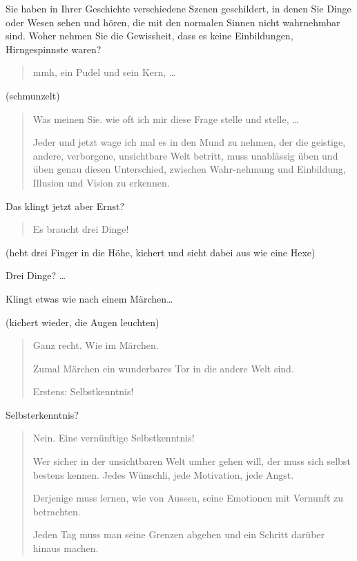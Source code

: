 \documentclass[10pt,titlepage,a5paper]{book}
\newenvironment{tg}{\begin{quote}\em}{\end{quote}}
\begin{document}
Sie haben in Ihrer Geschichte verschiedene Szenen geschildert, in denen Sie Dinge oder Wesen sehen und hören, die mit den normalen Sinnen nicht wahrnehmbar sind. Woher nehmen Sie die Gewissheit, dass es keine Einbildungen, Hirngespinnste waren?

\begin{tg}

mmh, ein Pudel und sein Kern, \dots 

\end{tg}

(schmunzelt)

\begin{tg}

Was meinen Sie. wie oft ich mir diese Frage stelle und stelle, \dots

Jeder und jetzt wage ich mal es in den Mund zu nehmen, der die geistige, andere, verborgene, unsichtbare Welt betritt, muss unablässig üben und üben genau diesen Unterschied, zwischen Wahr-nehmung und Einbildung, Illusion und Vision zu erkennen. 

\end{tg}


Das klingt jetzt aber Ernst?

\begin{tg}

Es braucht drei Dinge!

\end{tg}

(hebt drei Finger in die Höhe, kichert und sieht dabei aus wie eine Hexe)

Drei Dinge? \dots

Klingt etwas wie nach einem Märchen\dots 

(kichert wieder, die Augen leuchten)

\begin{tg}

Ganz recht. Wie im Märchen.

Zumal Märchen ein wunderbares Tor in die andere Welt sind.

Erstens: Selbstkenntnis!

\end{tg}

Selbsterkenntnis?

\begin{tg}

Nein. Eine vernünftige Selbstkenntnis!

Wer sicher in der unsichtbaren Welt umher gehen will, der muss sich selbst bestens kennen. Jedes Wünschli, jede Motivation, jede Angst. 

Derjenige muss lernen, wie von Aussen, seine Emotionen mit Vernunft zu betrachten.

Jeden Tag muss man seine Grenzen abgehen und ein Schritt darüber hinaus machen.

\end{tg}  
\end{document}
